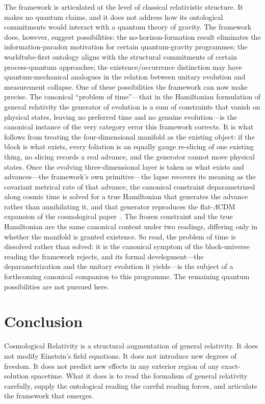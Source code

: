 \documentclass[11pt,a4paper]{article}
\theoremstyle{definition}
\begin{document}
The framework is articulated at the level of classical relativistic structure. It makes no quantum claims, and it does not address how its ontological commitments would interact with a quantum theory of gravity. The framework does, however, suggest possibilities: the no-horizon-formation result eliminates the information-paradox motivation for certain quantum-gravity programmes; the worldtube-first ontology aligns with the structural commitments of certain process-quantum approaches; the existence/occurrence distinction may have quantum-mechanical analogues in the relation between unitary evolution and measurement collapse. One of these possibilities the framework can now make precise. The canonical ``problem of time''---that in the Hamiltonian formulation of general relativity the generator of evolution is a sum of constraints that vanish on physical states, leaving no preferred time and no genuine evolution---is the canonical instance of the very category error this framework corrects. It is what follows from treating the four-dimensional manifold as the existing object: if the block is what exists, every foliation is an equally gauge re-slicing of one existing thing, no slicing records a real advance, and the generator cannot move physical states. Once the evolving three-dimensional layer is taken as what exists and advances---the framework's own primitive---the lapse recovers its meaning as the covariant metrical rate of that advance, the canonical constraint deparametrized along cosmic time is solved for a true Hamiltonian that generates the advance rather than annihilating it, and that generator reproduces the flat-$\Lambda$CDM expansion of the cosmological paper~\cite{JanzenCRcosmology}. The frozen constraint and the true Hamiltonian are the same canonical content under two readings, differing only in whether the manifold is granted existence. So read, the problem of time is dissolved rather than solved: it is the canonical symptom of the block-universe reading the framework rejects, and its formal development---the deparametrization and the unitary evolution it yields---is the subject of a forthcoming canonical companion to this programme. The remaining quantum possibilities are not pursued here.

\section{Conclusion}\label{sec:conclusion}

Cosmological Relativity is a structural augmentation of general relativity. It does not modify Einstein's field equations. It does not introduce new degrees of freedom. It does not predict new effects in any exterior region of any exact-solution spacetime. What it does is to read the formalism of general relativity carefully, supply the ontological reading the careful reading forces, and articulate the framework that emerges.
\end{document}
